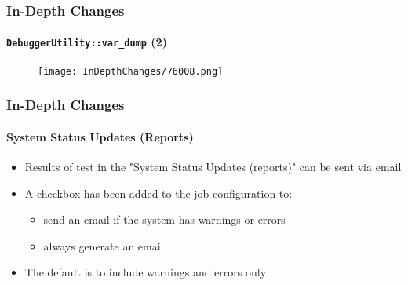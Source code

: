 \begin{frame}[fragile]
	\frametitle{In-Depth Changes}
	\framesubtitle{\texttt{DebuggerUtility::var\_dump} (2)}

	\begin{figure}
		\texttt{[image: InDepthChanges/76008.png]}
	\end{figure}

\end{frame}

\begin{frame}[fragile]
	\frametitle{In-Depth Changes}
	\framesubtitle{System Status Updates (Reports)}

	\begin{itemize}
		\item Results of test in the "System Status Updates (reports)" can be sent via email
		\item A checkbox has been added to the job configuration to:

			\begin{itemize}
				\item send an email if the system has warnings or errors
				\item always generate an email
			\end{itemize}

		\item The default is to include warnings and errors only

	\end{itemize}

\end{frame}


